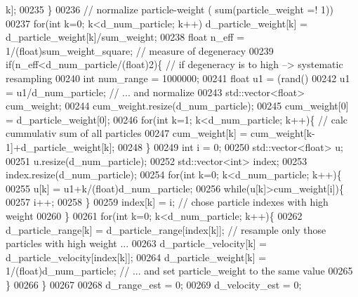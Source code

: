 \begin{DoxyCode}
      k];
00235         \}
00236         \textcolor{comment}{// normalize particle-weight ( sum(particle\_weight =! 1))}
00237         \textcolor{keywordflow}{for}(\textcolor{keywordtype}{int} k=0; k<d_num_particle; k++) d_particle_weight[k] = 
      d_particle_weight[k]/sum\_weight;
00238         \textcolor{keywordtype}{float} n\_eff = 1/(float)sum\_weight\_square; \textcolor{comment}{// measure of degeneracy}
00239         \textcolor{keywordflow}{if}(n\_eff<d\_num\_particle/(\textcolor{keywordtype}{float})2)\{ \textcolor{comment}{// if degeneracy is to high --> systematic resampling}
00240             \textcolor{keywordtype}{int} num\_range = 1000000;
00241             \textcolor{keywordtype}{float} u1 = (rand()%
00242             u1 = u1/d_num_particle; \textcolor{comment}{// ... and normalize}
00243             std::vector<float> cum\_weight;
00244             cum\_weight.resize(d\_num\_particle);
00245             cum\_weight[0] = d_particle_weight[0];
00246             \textcolor{keywordflow}{for}(\textcolor{keywordtype}{int} k=1; k<d_num_particle; k++)\{ \textcolor{comment}{// calc cummulativ sum of all particles}
00247                 cum\_weight[k] = cum\_weight[k-1]+d_particle_weight[k];
00248             \}
00249             \textcolor{keywordtype}{int} i = 0;
00250             std::vector<float> u;
00251             u.resize(d\_num\_particle);
00252             std::vector<int> index;
00253             index.resize(d\_num\_particle);
00254             \textcolor{keywordflow}{for}(\textcolor{keywordtype}{int} k=0; k<d_num_particle; k++)\{
00255                 u[k] = u1+k/(float)d\_num\_particle;
00256                 \textcolor{keywordflow}{while}(u[k]>cum\_weight[i])\{
00257                     i++;
00258                 \}
00259                 index[k] = i; \textcolor{comment}{// chose particle indexes with high weight}
00260             \}
00261             \textcolor{keywordflow}{for}(\textcolor{keywordtype}{int} k=0; k<d_num_particle; k++)\{
00262                 d_particle_range[k] = d_particle_range[index[k]]; \textcolor{comment}{// resample only those particles with
       high weight ...}
00263                 d_particle_velocity[k] = d_particle_velocity[index[k]];
00264                 d_particle_weight[k] = 1/(float)d\_num\_particle; \textcolor{comment}{// ... and set particle\_weight to the same
       value}
00265             \}
00266         \}
00267         
00268         d_range_est = 0;
00269         d_velocity_est = 0;

\end{DoxyCode}
